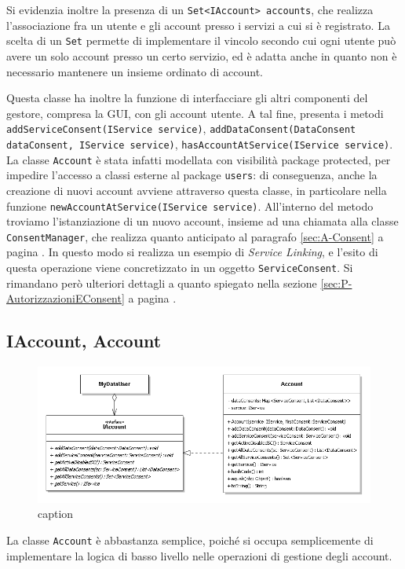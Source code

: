 Si evidenzia inoltre la presenza di un \texttt{Set<IAccount> accounts}, che realizza l’associazione fra un utente e gli account presso i servizi a cui si \`e registrato. La scelta di un \texttt{Set} permette di implementare il vincolo secondo cui ogni utente pu\`o avere un solo account presso un certo servizio, ed \`e adatta anche in quanto non \`e necessario mantenere un insieme ordinato di account.

Questa classe ha inoltre la funzione di interfacciare gli altri componenti del gestore, compresa la GUI, con gli account utente. A tal fine, presenta i metodi \texttt{addServiceConsent(IService service)}, \texttt{addDataConsent(DataConsent  dataConsent, IService service)}, \texttt{hasAccountAtService(IService service)}.  La classe \texttt{Account} \`e stata infatti modellata con visibilit\`a package protected, per impedire l’accesso a classi esterne al package \texttt{users}: di conseguenza, anche la creazione di nuovi account avviene attraverso questa classe, in particolare nella funzione \texttt{newAccountAtService(IService service)}. All’interno del metodo troviamo l’istanziazione di un nuovo account, insieme ad una chiamata alla classe \texttt{ConsentManager}, che realizza quanto anticipato al paragrafo \ref{sec:A-Consent} a pagina \pageref{sec:A-Consent}. In questo modo si realizza un esempio di \textit{Service Linking}, e l’esito di questa operazione viene concretizzato in un oggetto \texttt{ServiceConsent}. Si rimandano per\`o ulteriori dettagli a quanto spiegato nella sezione \ref{sec:P-AutorizzazioniEConsent} a pagina \pageref{sec:P-AutorizzazioniEConsent}.

\subsection{IAccount, Account}
\begin{figure} [h]
	\includegraphics[width=\linewidth]{pictures/Accounting-Account.png}
	\caption{caption}
	\label{fig:Accounting-Account}
\end{figure}
La classe \texttt{Account} \`e abbastanza semplice, poich\'e si occupa semplicemente di implementare la logica di basso livello nelle operazioni di gestione degli account.

